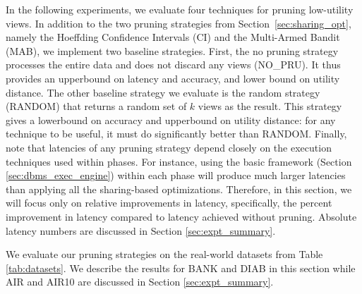 In the following experiments, we evaluate four techniques for pruning low-utility views.
In addition to the two pruning strategies from Section~\ref{sec:sharing_opt}, 
namely the Hoeffding Confidence Intervals (CI) and the Multi-Armed Bandit (MAB),
we implement two baseline strategies.
First, the no pruning strategy processes the entire data and does not discard any views (NO\_PRU). 
It thus provides an upperbound on latency and accuracy, and lower bound on utility distance.
The other baseline strategy we evaluate is the random strategy (RANDOM) that returns a random 
set of $k$ views as the result.
This strategy gives a lowerbound on accuracy and upperbound on utility distance: for any 
technique to be useful, it must do significantly better than RANDOM.
Finally, note that latencies of any pruning strategy depend closely on the execution techniques 
used within phases. 
For instance, using the basic \SeeDB framework (Section \ref{sec:dbms_exec_engine}) within each phase
will produce much larger latencies than applying all the sharing-based optimizations.
Therefore, in this section, we will focus only on relative 
improvements in latency, specifically, the percent improvement in latency compared to latency
achieved without pruning.
Absolute latency numbers are discussed in Section \ref{sec:expt_summary}.


We evaluate our pruning strategies on the real-world datasets from Table \ref{tab:datasets}. 
We describe the results for BANK and DIAB in this section while AIR and AIR10 are discussed 
in Section \ref{sec:expt_summary}. 






